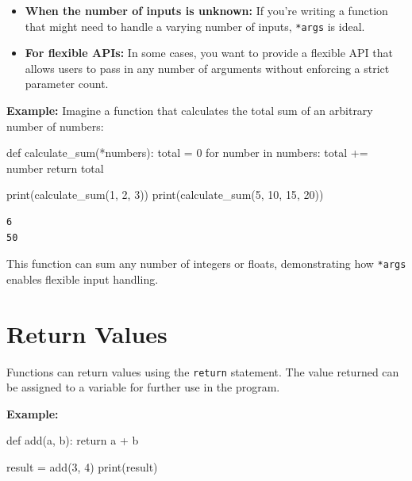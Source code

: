 \documentclass[
  letterpaper,
  DIV=11,
  numbers=noendperiod]{scrreprt}
\newenvironment{Shaded}{\begin{snugshade}}{\end{snugshade}}
\newcommand{\BuiltInTok}[1]{\textcolor[rgb]{0.00,0.23,0.31}{#1}}
\newcommand{\ControlFlowTok}[1]{\textcolor[rgb]{0.00,0.23,0.31}{#1}}
\newcommand{\DecValTok}[1]{\textcolor[rgb]{0.68,0.00,0.00}{#1}}
\newcommand{\KeywordTok}[1]{\textcolor[rgb]{0.00,0.23,0.31}{#1}}
\newcommand{\NormalTok}[1]{\textcolor[rgb]{0.00,0.23,0.31}{#1}}
\newcommand{\OperatorTok}[1]{\textcolor[rgb]{0.37,0.37,0.37}{#1}}
\providecommand{\tightlist}{%
  \setlength{\itemsep}{0pt}\setlength{\parskip}{0pt}}\usepackage{longtable,booktabs,array}
\begin{document}
\begin{itemize}
\tightlist
\item
  \textbf{When the number of inputs is unknown:} If you're writing a
  function that might need to handle a varying number of inputs,
  \texttt{*args} is ideal.
\item
  \textbf{For flexible APIs:} In some cases, you want to provide a
  flexible API that allows users to pass in any number of arguments
  without enforcing a strict parameter count.
\end{itemize}

\textbf{Example:} Imagine a function that calculates the total sum of an
arbitrary number of numbers:

\begin{Shaded}
\begin{Highlighting}[]
\KeywordTok{def}\NormalTok{ calculate\_sum(}\OperatorTok{*}\NormalTok{numbers):}
\NormalTok{    total }\OperatorTok{=} \DecValTok{0}
    \ControlFlowTok{for}\NormalTok{ number }\KeywordTok{in}\NormalTok{ numbers:}
\NormalTok{        total }\OperatorTok{+=}\NormalTok{ number}
    \ControlFlowTok{return}\NormalTok{ total}

\BuiltInTok{print}\NormalTok{(calculate\_sum(}\DecValTok{1}\NormalTok{, }\DecValTok{2}\NormalTok{, }\DecValTok{3}\NormalTok{)) }
\BuiltInTok{print}\NormalTok{(calculate\_sum(}\DecValTok{5}\NormalTok{, }\DecValTok{10}\NormalTok{, }\DecValTok{15}\NormalTok{, }\DecValTok{20}\NormalTok{))}
\end{Highlighting}
\end{Shaded}

\begin{verbatim}
6
50
\end{verbatim}

This function can sum any number of integers or floats, demonstrating
how \texttt{*args} enables flexible input handling.

\hypertarget{return-values}{%
\section{Return Values}\label{return-values}}

Functions can return values using the \texttt{return} statement. The
value returned can be assigned to a variable for further use in the
program.

\textbf{Example:}

\begin{Shaded}
\begin{Highlighting}[]
\KeywordTok{def}\NormalTok{ add(a, b):}
    \ControlFlowTok{return}\NormalTok{ a }\OperatorTok{+}\NormalTok{ b}

\NormalTok{result }\OperatorTok{=}\NormalTok{ add(}\DecValTok{3}\NormalTok{, }\DecValTok{4}\NormalTok{)}
\BuiltInTok{print}\NormalTok{(result) }
\end{Highlighting}
\end{Shaded}
\end{document}
